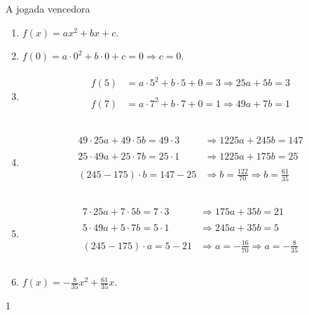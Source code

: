 \begin{answer}{A jogada vencedora}
{
\begin{enumerate}
\item {} 
\(f(x)=ax^2+bx+c\).

\item {} 
\(f(0)=a \cdot 0^2+b \cdot 0+c=0 \Rightarrow c=0\).

\item {} \begin{align*}\!\begin{aligned}
f(5)& =a \cdot 5^2+b \cdot 5+0=3 \Rightarrow 25a+5b=3 \\\\
f(7)& =a \cdot 7^2+b \cdot 7+0=1 \Rightarrow 49a+7b=1 \\\\
\end{aligned}\end{align*}
\item {} \begin{align*}\!\begin{aligned}
49 \cdot 25a+ 49 \cdot 5b= 49 \cdot 3 & \Rightarrow 1225a+245b=147 \\\\
25 \cdot 49a+ 25 \cdot 7b = 25 \cdot 1 & \Rightarrow 1225a+175b=25 \\\\
(245-175) \cdot b = 147-25 & \Rightarrow b= \frac{122}{70} \Rightarrow b= \frac{61}{35} \\\\
\end{aligned}\end{align*}
\item {} \begin{align*}\!\begin{aligned}
7 \cdot 25a+ 7 \cdot 5b= 7 \cdot 3 & \Rightarrow 175a+35b=21 \\\\
5 \cdot 49a+ 5 \cdot 7b = 5 \cdot 1 & \Rightarrow 245a+35b=5 \\\\
(245-175) \cdot a = 5-21 & \Rightarrow a= - \frac{16}{70} \Rightarrow a=- \frac{8}{35} \\\\
\end{aligned}\end{align*}
\item {} 
\(f(x)= - \frac{8}{35}x^2+ \frac{61}{35}x\).
\end{enumerate}
}{1}
\end{answer}

